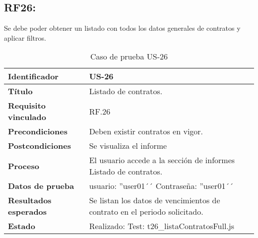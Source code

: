 \subsection{RF26:} Se debe poder obtener un listado con todos los datos generales de contratos y aplicar filtros.
\begin{table}[H]
	\centering
	\renewcommand{\arraystretch}{1.3} 
	\begin{tabularx}{\textwidth}{|l|X|}
		\hline
		\textbf{Identificador} & US-26 \\
		\hline
		\textbf{Título} &Listado de contratos. \\
		\hline
		\textbf{Requisito vinculado} & RF.26 \\
		\hline
		\textbf{Precondiciones} & Deben existir contratos en vigor.\\
		\hline
		\textbf{Postcondiciones} & Se visualiza el informe \\
		\hline
		\textbf{Proceso} & El usuario accede a la sección de informes Listado de contratos. \\
		\hline
		\textbf{Datos de prueba} & usuario: ''user01´´ Contraseña: ''user01´´ \\
		\hline
		\textbf{Resultados esperados} & Se listan los datos de vencimientos de contrato en el periodo solicitado. \\
		\hline
		\textbf{Estado} & Realizado: Test: t26\_listaContratosFull.js \\
		\hline
	\end{tabularx}
	\caption{Caso de prueba US-26}
	\label{tab:caso_uso26}
\end{table}

